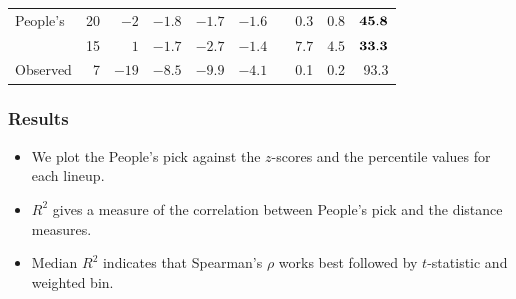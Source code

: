 \documentclass{beamer}
\begin{document}
\begin{frame}
\begin{table}[hbt]
\begin{tabular}{l r rrrr r rrr}
People's  	& 20 & $-2$ & $-1.8$ & $-1.7$ & $ -1.6$ & & $0.3$ & $0.8$ & $\bf 45.8$ \\[-0.5ex]  
		 & 15 & $1$ & $-1.7$ & $-2.7$ & $ -1.4$ & & $7.7$ & $4.5$ & $\bf 33.3$ \\[-0.5ex]

\hline
Observed & 7  & $-19$ & $-8.5$ & $-9.9$ & $-4.1$ & & 0.1 & 0.2 & 93.3\\[1ex]
\hline
\end{tabular}
\label{sca_table}
\end{table}

\end{frame}


\begin{frame}
\frametitle{Results}
\begin{itemize}
\item We plot the People's pick against the $z$-scores and the percentile values for each lineup.
\item $R^2$ gives a measure of the correlation between People's pick and the distance measures.
\item Median $R^2$ indicates that Spearman's $\rho$ works best followed by $t$-statistic and weighted bin.
\end{itemize}
\end{frame}

\end{document}
